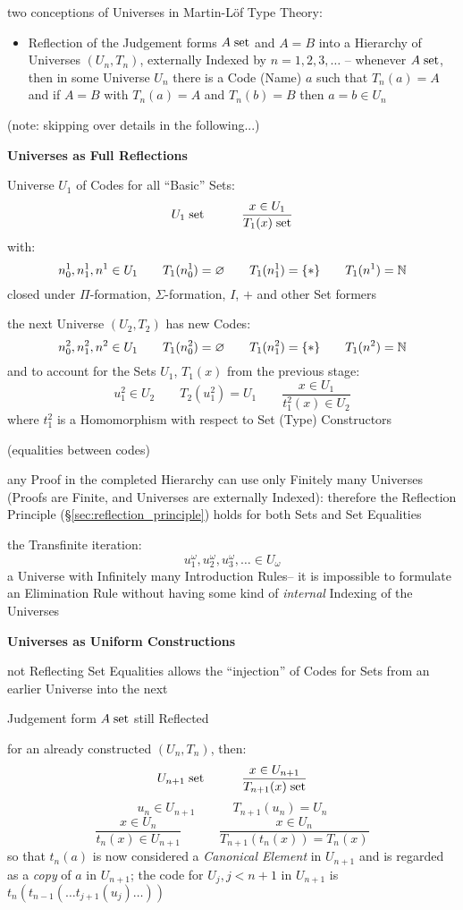 two conceptions of Universes in Martin-L\"of Type Theory:
\begin{itemize}
  \item Reflection of the Judgement forms $A \;\mathrm{set}$ and $A = B$ into a
    Hierarchy of Universes $(U_n,T_n)$, externally Indexed by $n =
    1,2,3,\ldots$ -- whenever $A \;\mathrm{set}$, then in some Universe $U_n$
    there is a Code (Name) $a$ such that $T_n(a) = A$ and if $A = B$
    with $T_n(a) = A$ and $T_n(b) = B$ then $a = b \in U_n$
\end{itemize}

(note: skipping over details in the following...) %


\textbf{Universes as Full Reflections}

Universe $U_1$ of Codes for all ``Basic'' Sets:
\[
  U_1 \;\mathrm{set} \quad\quad\quad \frac{x \in U_1}{T_1(x) \;\mathrm{set}}
\]
with:
\[
  n_0^1,n_1^1,n^1 \in U_1 \quad\quad T_1(n_0^1) = \varnothing
    \quad\quad T_1(n_1^1) = \{*\} \quad\quad T_1(n^1) = \mathbb{N}
\]
closed under $\Pi$-formation, $\Sigma$-formation, $I$, $+$ and other
Set formers

the next Universe $(U_2,T_2)$ has new Codes:
\[
  n_0^2,n_1^2,n^2 \in U_1 \quad\quad T_1(n_0^2) = \varnothing
    \quad\quad T_1(n_1^2) = \{*\} \quad\quad T_1(n^2) = \mathbb{N}
\]
and to account for the Sets $U_1$, $T_1(x)$ from the previous stage:
\[
  u_1^2 \in U_2 \quad\quad T_2(u^2_1)=U_1 \quad\quad
    \frac{x \in U_1}{t_1^2(x) \in U_2}
\]
where $t_1^2$ is a Homomorphism with respect to Set (Type)
Constructors

(equalities between codes) %

any Proof in the completed Hierarchy can use only Finitely many
Universes (Proofs are Finite, and Universes are externally Indexed):
therefore the Reflection Principle (\S\ref{sec:reflection_principle})
holds for both Sets and Set Equalities

the Transfinite iteration:
\[
  u_1^\omega, u_2^\omega, u_3^\omega, \ldots \in U_\omega
\]
a Universe with Infinitely many Introduction Rules-- it is impossible
to formulate an Elimination Rule without having some kind of
\emph{internal} Indexing of the Universes


\textbf{Universes as Uniform Constructions}

not Reflecting Set Equalities allows the ``injection'' of Codes for
Sets from an earlier Universe into the next

Judgement form $A \;\mathrm{set}$ still Reflected

for an already constructed $(U_n,T_n)$, then:
\[
  U_{n+1} \;\mathrm{set} \quad\quad\quad \frac{x \in U_{n+1}}{T_{n+1}(x) \;\mathrm{set}}
\] \[
  u_n \in U_{n+1} \quad\quad\quad T_{n+1}(u_n) = U_n
\] \[
  \frac{x \in U_n}{t_n(x) \in U_{n+1}} \quad\quad\quad
    \frac{x \in U_n}{T_{n+1}(t_n(x)) = T_n(x)}
\]
so that $t_n(a)$ is now considered a \emph{Canonical Element} in
$U_{n+1}$ and is regarded as a \emph{copy} of $a$ in $U_{n+1}$; the
code for $U_j, j < n+1$ in $U_{n+1}$ is $t_n(t_{n-1}(\ldots
t_{j+1}(u_j) \ldots))$


